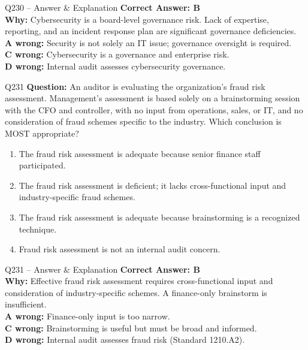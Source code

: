 \documentclass[aspectratio=169,10pt]{beamer}
\begin{document}
	\begin{frame}[t]{Q230 -- Answer \& Explanation}
		\small
		\textbf{Correct Answer: B} \\[4pt]
		\textbf{Why:} Cybersecurity is a board-level governance risk. Lack of expertise, reporting, and an incident response plan are significant governance deficiencies. \\[4pt]
		\textbf{A wrong:} Security is not solely an IT issue; governance oversight is required. \\[2pt]
		\textbf{C wrong:} Cybersecurity is a governance and enterprise risk. \\[2pt]
		\textbf{D wrong:} Internal audit assesses cybersecurity governance.
	\end{frame}
	
	\begin{frame}[t]{Q231}
		\small
		\textbf{Question:} An auditor is evaluating the organization's fraud risk assessment. Management's assessment is based solely on a brainstorming session with the CFO and controller, with no input from operations, sales, or IT, and no consideration of fraud schemes specific to the industry. Which conclusion is MOST appropriate?
		\begin{enumerate}[label=\Alph*.,itemsep=1pt,topsep=2pt]
			\item The fraud risk assessment is adequate because senior finance staff participated.
			\item The fraud risk assessment is deficient; it lacks cross-functional input and industry-specific fraud schemes.
			\item The fraud risk assessment is adequate because brainstorming is a recognized technique.
			\item Fraud risk assessment is not an internal audit concern.
		\end{enumerate}
	\end{frame}
	
	\begin{frame}[t]{Q231 -- Answer \& Explanation}
		\small
		\textbf{Correct Answer: B} \\[4pt]
		\textbf{Why:} Effective fraud risk assessment requires cross-functional input and consideration of industry-specific schemes. A finance-only brainstorm is insufficient. \\[4pt]
		\textbf{A wrong:} Finance-only input is too narrow. \\[2pt]
		\textbf{C wrong:} Brainstorming is useful but must be broad and informed. \\[2pt]
		\textbf{D wrong:} Internal audit assesses fraud risk (Standard 1210.A2).
	\end{frame}
	
\end{document}
